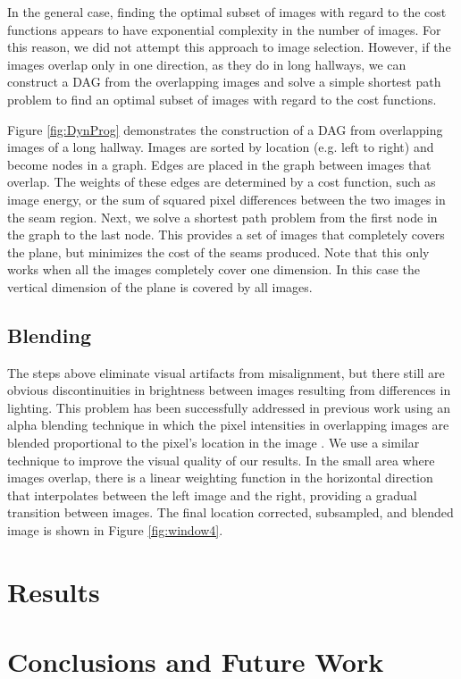 \documentclass[runningheads]{llncs}
\begin{document}
In the general case, finding the optimal subset of images with regard to the cost functions appears to have exponential complexity in the number of images. For this reason, we did not attempt this approach to image selection. However, if the images overlap only in one direction, as they do in long hallways, we can construct a DAG from the overlapping images and solve a simple shortest path problem to find an optimal subset of images with regard to the cost functions.

Figure \ref{fig:DynProg} demonstrates the construction of a DAG from overlapping images of a long hallway. Images are sorted by location (e.g. left to right) and become nodes in a graph. Edges are placed in the graph between images that overlap. The weights of these edges are determined by a cost function, such as image energy, or the sum of squared pixel differences between the two images in the seam region. Next, we solve a shortest path problem from the first node in the graph to the last node. This provides a set of images that completely covers the plane, but minimizes the cost of the seams produced. Note that this only works when all the images completely cover one dimension. In this case the vertical dimension of the plane is covered by all images. 

\subsection{Blending}

The steps above eliminate visual artifacts from misalignment, but there still are obvious discontinuities in brightness between images resulting from differences in lighting. This problem has been successfully addressed in previous work using an alpha blending technique in which the pixel intensities in overlapping images are blended proportional to the pixel's location in the image \cite{liu2010indoor}. We use a similar technique to improve the visual quality of our results. In the small area where images overlap, there is a linear weighting function in the horizontal direction that interpolates between the left image and the right, providing a gradual transition between images. The final location corrected, subsampled, and blended image is shown in Figure \ref{fig:window4}.

\section{Results}
\label{sec:results}

\section{Conclusions and Future Work}
\label{sec:results}



\small





\end{document}
